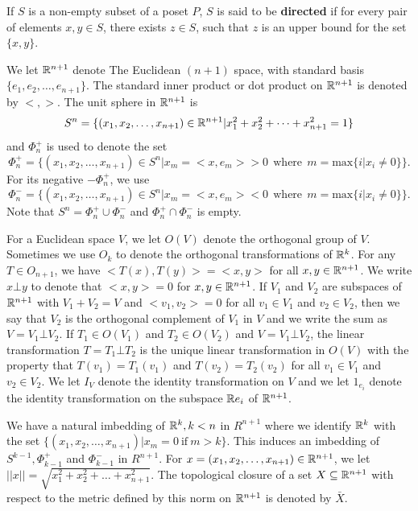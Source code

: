 \documentclass[psamsfonts]{amsart}
\numberwithin{equation}{subsection}
\theoremstyle{plain}
\theoremstyle{definition}
\theoremstyle{remark}
\begin{document}
If $S$ is a non-empty subset of a poset $P$, $S$ is said to be {\bf directed} if for every pair of elements $x, y \in S$, there exists $z \in S$, such that $z$ is an
upper bound for the set $\{x, y\}$. 



We let $\Bbb{R}^{n + 1}$ denote The Euclidean $(n + 1)$ space, with standard basis $\{e_1, e_2, \dots , e_{n + 1}\}$.   The standard  inner product or dot product on $\Bbb{R}^{n+1}$ is denoted by  $< , >$. The unit sphere in 
$\Bbb{R}^{n+1}$ is 
$$S^n = \{(x_1, x_2, \dots , x_{n+1}) \in \Bbb{R}^{n+1}  | x_1^2 + x_2^2 + \dots + x_{n+1}^2 = 1\}$$
 and $\Phi_n^+$
 is used to denote the set 
 $$\Phi_n^+ = \{(x_1, x_2, \dots , x_{n + 1}) \in S^n | x_m  = <x, e_m>  > 0 \ \ \mbox{where} \ \ m = \mbox{max}\{i | x_i \not= 0\} \}.$$
For its negative   $ -\Phi_n^+ $, we use 
$$\Phi_n^- =  \{(x_1, x_2, \dots , x_{n + 1}) \in S^n | x_m  = <x, e_m> < 0 \ \ \mbox{where} \ \ m = \mbox{max}\{i | x_i \not= 0\} \}.$$
Note that $S^n = \Phi_n^+ \cup \Phi_n^-$ and $\Phi_n^+ \cap \Phi_n^-$ is empty. 

For  a Euclidean  space $V$, we let $O(V)$ denote the orthogonal group of $V$. Sometimes we use 
 $O_{k}$  to denote the orthogonal transformations of  $\Bbb{R}^{k}$.
For any $T \in O_{n + 1}$, we have  $<T(x), T(y)> = <x, y>$ for all  $x, y \in \Bbb{R}^{n + 1}$.  
We write $x\bot y$ to denote that  $<x, y> = 0$ for $x, y \in \Bbb{R}^{n + 1}$. 
If $V_1$ and $V_2$ are subspaces of $\Bbb{R}^{n + 1}$ with $V_1 + V_2 = V$ and $<v_1, v_2> = 0$ for all $v_1 \in V_1$ and $v_2 \in V_2$, then we 
say that $V_2$ is the orthogonal complement of $V_1$ in $V$ and we write the sum as $V = V_1 \bot V_2$. If $T_1 \in O(V_1)$ and $T_2 \in O(V_2)$ and $V = V_1 \bot V_2$, the linear  transformation $T = T_1 \bot T_2$ is the unique linear transformation in 
$O(V)$ with the property that  $T(v_1) = T_1(v_1)$ and $T(v_2) = T_2(v_2)$ for all $v_1 \in V_1$ and $v_2 \in V_2$. We let $I_V$ denote the identity transformation on $V$ and we let $1_{e_i}$ denote the identity transformation on the subspace $\Bbb{R}e_i$ of $\Bbb{R}^{n + 1}$. 

We  have a natural imbedding of $\Bbb{R}^{k}, k < n$  in $R^{n + 1}$ where we identify 
$\Bbb{R}^{k}$ with the set $\{(x_1, x_2, \dots , x_{n + 1} )| x_m = 0 \ \mbox{if} \ m > k \}$. 
This induces an imbedding of $S^{k - 1}, \Phi_{k - 1}^+$  and $\Phi_{k - 1}^-$ in $R^{n + 1}$. 
For $x = (x_1, x_2, \dots , x_{n + 1})  \in \Bbb{R}^{n + 1}$, we let $||x|| = \sqrt{x_1^2 + x_2^2 + \dots + x_{n + 1}^2}$. 
The topological closure of a set $X \subseteq \Bbb{R}^{n + 1}$ with respect to the metric defined by this norm on $\Bbb{R}^{n + 1}$ is denoted by $\bar{X}$. 
\end{document}

